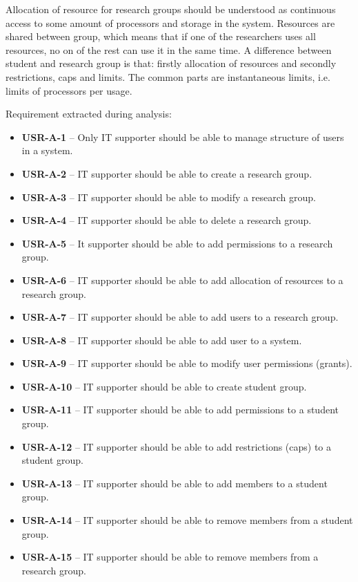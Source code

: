 \documentclass{report}
\begin{document}
	Allocation of resource for research groups should be understood as continuous access to some amount of processors and storage in the system. Resources are shared between group, which means that if one of the researchers uses all resources, no on of the rest can use it in the same time. A difference between student and research group is that: firstly allocation of resources and secondly restrictions, caps and limits. The common parts are instantaneous limits, i.e. limits of processors per usage.
	
Requirement extracted during analysis:
\begin{itemize}
	\item
	{
		\textbf{USR-A-1} -- Only IT supporter should be able to manage structure of users in a system.
	}
	\item
	{
		\textbf{USR-A-2} -- IT supporter should be able to create a research group.
	}
	\item
	{
		\textbf{USR-A-3} -- IT supporter should be able to modify a research group.
	}
	\item
	{
		\textbf{USR-A-4} -- IT supporter should be able to delete a research group.
	}
	\item
	{
		\textbf{USR-A-5} -- It supporter should be able to add permissions to a research group.
	}
	\item
	{
		\textbf{USR-A-6} -- IT supporter should be able to add allocation of resources to a research group.
	}
	\item
	{
		\textbf{USR-A-7} -- IT supporter should be able to add users to a research group.
	}
	\item
	{
		\textbf{USR-A-8} -- IT supporter should be able to add user to a system.
	}
	\item
	{
		\textbf{USR-A-9} -- IT supporter should be able to modify user permissions (grants).
	}
	\item
	{
		\textbf{USR-A-10} -- IT supporter should be able to create student group.
	}
	\item
	{
		\textbf{USR-A-11} -- IT supporter should be able to add permissions to a student group.
	}
	\item
	{
		\textbf{USR-A-12} -- IT supporter should be able to add restrictions (caps) to a student group.
	}
	\item
	{
		\textbf{USR-A-13} -- IT supporter should be able to add members to a student group.
	}
	\item
	{
		\textbf{USR-A-14} -- IT supporter should be able to remove members from a student group.
	}
	\item
	{
		\textbf{USR-A-15} -- IT supporter should be able to remove members from a research group.
	}
\end{itemize}
\end{document}

